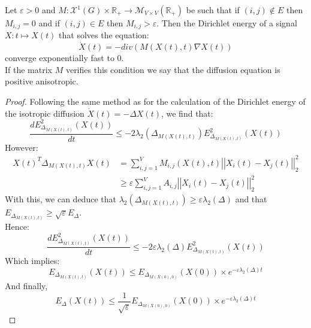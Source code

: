 \documentclass[12pt]{article}
\begin{document}
\begin{thm}\label{anipos}
    Let $\varepsilon > 0$ and $M: \mathcal{X}^1(G) \times \mathbb{R}_+ \longrightarrow \mathcal{M}_{V\times V}(\mathbb{R}_+)$ be such that if $(i,j)\not\in E$ then $M_{i,j} = 0$ and if $(i,j) \in E$ then $M_{i,j} > \varepsilon$. Then the Dirichlet energy of a signal $X: t \mapsto X(t)$ that solves the equation:
    \begin{equation}
        \dot{X}(t) = - div(M(X(t),t) \nabla X(t))
    \end{equation}
    converge exponentially fast to 0.\\
    If the matrix $M$ verifies this condition we say that the diffusion equation is positive anisotropic.
\end{thm}

\begin{proof}
    Following the same method as for the calculation of the Dirichlet energy of the isotropic diffusion $\dot{X}(t) = - \Delta X(t)$, we find that:
    \begin{equation*}
         \frac{d E_{\Delta_{M(X(t),t)}}^2(X(t))}{dt} \leq -2  \lambda_2(\Delta_{M(X(t),t)})E_{\Delta_{M(X(t),t)}}^2(X(t))
    \end{equation*}
    However:
    \begin{align*}
        X(t)^T\Delta_{M(X(t),t)} X(t) &= \sum_{i,j =1}^V M_{i,j}(X(t),t) \left| \left| X_i(t) - X_j(t)\right| \right|_2^2 \\
        &\geq \varepsilon \sum_{i,j =1}^V A_{i,j} \left| \left| X_i(t) - X_j(t)\right| \right|_2^2
    \end{align*}
    With this, we can deduce that $\lambda_2(\Delta_{M(X(t),t)}) \geq \varepsilon \lambda_2(\Delta)$ and that $E_{\Delta_{M(X(t),t)}} \geq \sqrt{\varepsilon} E_{\Delta}$.\\

    Hence: 
    \begin{equation*}
        \frac{d E_{\Delta_{M(X(t),t)}}^2(X(t))}{dt} \leq -2  \varepsilon\lambda_2(\Delta)E_{\Delta_{M(X(t),t)}}^2(X(t))
    \end{equation*}
    Which implies:
    \begin{equation*}
        E_{\Delta_{M(X(t),t)}}(X(t)) \leq E_{\Delta_{M(X(0),0)}}(X(0)) \times e^{-\varepsilon \lambda_2(\Delta) t}
    \end{equation*}
    And finally,
    \begin{equation*}
        E_{\Delta}(X(t)) \leq \frac{1}{\sqrt{\varepsilon}}E_{\Delta_{M(X(0),0)}}(X(0)) \times e^{-\varepsilon \lambda_2(\Delta) t}
    \end{equation*}
\end{proof}
\end{document}
